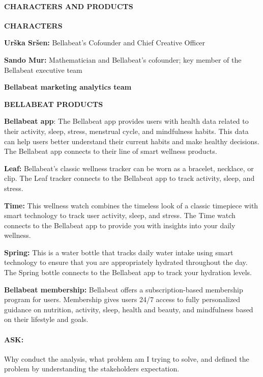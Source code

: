 \documentclass[
]{article}
\begin{document}
\hypertarget{characters-and-products}{%
\paragraph{\texorpdfstring{\textbf{CHARACTERS AND
PRODUCTS}}{CHARACTERS AND PRODUCTS}}\label{characters-and-products}}

\textbf{CHARACTERS}

\textbf{Urška Sršen:} Bellabeat's Cofounder and Chief Creative Officer

\textbf{Sando Mur:} Mathematician and Bellabeat's cofounder; key member
of the Bellabeat executive team

\textbf{Bellabeat marketing analytics team}

\textbf{BELLABEAT PRODUCTS}

\textbf{Bellabeat app}: The Bellabeat app provides users with health
data related to their activity, sleep, stress, menstrual cycle, and
mindfulness habits. This data can help users better understand their
current habits and make healthy decisions. The Bellabeat app connects to
their line of smart wellness products.

\textbf{Leaf:} Bellabeat's classic wellness tracker can be worn as a
bracelet, necklace, or clip. The Leaf tracker connects to the Bellabeat
app to track activity, sleep, and stress.

\textbf{Time:} This wellness watch combines the timeless look of a
classic timepiece with smart technology to track user activity, sleep,
and stress. The Time watch connects to the Bellabeat app to provide you
with insights into your daily wellness.

\textbf{Spring:} This is a water bottle that tracks daily water intake
using smart technology to ensure that you are appropriately hydrated
throughout the day. The Spring bottle connects to the Bellabeat app to
track your hydration levels.

\textbf{Bellabeat membership:} Bellabeat offers a subscription-based
membership program for users. Membership gives users 24/7 access to
fully personalized guidance on nutrition, activity, sleep, health and
beauty, and mindfulness based on their lifestyle and goals.

\hypertarget{ask}{%
\paragraph{\texorpdfstring{\textbf{ASK:}}{ASK:}}\label{ask}}

Why conduct the analysis, what problem am I trying to solve, and defined
the problem by understanding the stakeholders expectation.
\end{document}

